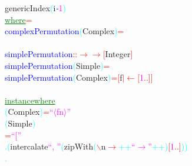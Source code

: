 {\rm{}genericIndex}\hsspace \textcolor{cyan}{(}{\rm{}i}\textcolor{blue}{{\it{}-}}\textcolor{magenta}{1}\textcolor{cyan}{)}\\\hstab \textcolor{green}{\underline{where}}\hsspace \textcolor{red}{=}\\\textcolor{blue}{complexPermutation}\hsspace \textcolor{cyan}{(}{\rm{}Complex}\textcolor{cyan}{)}\hsspace \textcolor{red}{=}\\\\\textcolor{blue}{simplePermutation}\hsspace \textcolor{red}{::}\hsspace \textcolor{red}{\ensuremath{\rightarrow}}\hsspace \textcolor{red}{\ensuremath{\rightarrow}}\hsspace \textcolor{red}{[}{\rm{}Integer}\textcolor{red}{]}\\\textcolor{blue}{simplePermutation}\hsspace \textcolor{cyan}{(}{\rm{}Simple}\textcolor{cyan}{)}\hsspace \textcolor{red}{=}\\\textcolor{blue}{simplePermutation}\hsspace \textcolor{cyan}{(}{\rm{}Complex}\textcolor{cyan}{)}\hsspace \textcolor{red}{=}\hsspace \textcolor{red}{[}{\rm{}f}\hsspace \textcolor{red}{\ensuremath{|}}\hsspace \textcolor{red}{\ensuremath{\leftarrow}}\hsspace \textcolor{red}{[}\textcolor{magenta}{1}\hsspace \textcolor{red}{..}\textcolor{red}{]}\textcolor{red}{]}\\\\\textcolor{green}{\underline{instance}}\hsspace \textcolor{green}{\underline{where}}\\\hsspace \textcolor{cyan}{(}{\rm{}Complex}\textcolor{cyan}{)}\hsspace \textcolor{red}{=}\hsspace \textcolor{magenta}{``\ensuremath{\langle}fn\ensuremath{\rangle}''}\\\hsspace \textcolor{cyan}{(}{\rm{}Simple}\textcolor{cyan}{)}\\\hstab \hstab \textcolor{red}{=}\hsspace \textcolor{magenta}{``[''}\\\hstab \hstab \textcolor{cyan}{.}\hsspace \textcolor{cyan}{(}{\rm{}intercalate}\hsspace \textcolor{magenta}{``, ''}\hsspace \textcolor{cyan}{(}{\rm{}zipWith}\hsspace \textcolor{cyan}{(}\textcolor{red}{$\backslash$}{\rm{}n}\hsspace \textcolor{red}{\ensuremath{\rightarrow}}\hsspace \textcolor{cyan}{++}\hsspace \textcolor{magenta}{``\ensuremath{\rightarrow}''}\hsspace \textcolor{cyan}{++}\textcolor{cyan}{)}\hsspace \textcolor{red}{[}\textcolor{magenta}{1}\textcolor{red}{..}\textcolor{red}{]}\textcolor{cyan}{)}\textcolor{cyan}{)}\\\hstab \hstab \textcolor{cyan}{.}\hsspace 